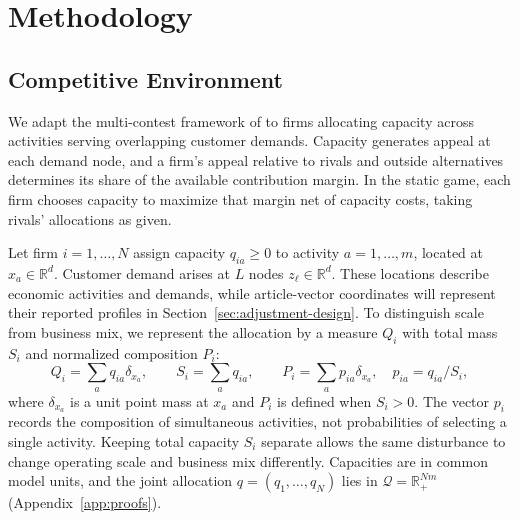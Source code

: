 \section{Methodology}\label{sec:model}

\subsection{Competitive Environment}\label{sec:model-payoff}

We adapt the multi-contest framework of
\citet{xu_zenou_zhou_conflict_2022} to firms allocating capacity
across activities serving overlapping customer demands.
Capacity generates appeal at each demand node, and a firm's appeal relative
to rivals and outside alternatives determines its share of the available
contribution margin.
In the static game, each firm chooses capacity to maximize that margin net
of capacity costs, taking rivals' allocations as given.

Let firm $i=1,\ldots,N$ assign capacity $q_{ia}\geq0$ to activity
$a=1,\ldots,m$, located at $x_a\in\mathbb R^d$.
Customer demand arises at $L$ nodes $z_\ell\in\mathbb R^d$.
These locations describe economic activities and demands, while article-vector
coordinates will represent their reported profiles in
Section~\ref{sec:adjustment-design}.
To distinguish scale from business mix, we represent the allocation by a
measure $Q_i$ with total mass $S_i$ and normalized composition $P_i$:
\begin{equation}\label{eq:position}
  Q_i=\sum_a q_{ia}\delta_{x_a},\qquad
  S_i=\sum_{a}q_{ia},\qquad
  P_i=\sum_a p_{ia}\delta_{x_a},\quad p_{ia}=q_{ia}/S_i,
\end{equation}
where $\delta_{x_a}$ is a unit point mass at $x_a$ and $P_i$ is defined when
$S_i>0$.
The vector $p_i$ records the composition of simultaneous activities, not
probabilities of selecting a single activity.
Keeping total capacity $S_i$ separate allows the same disturbance to change
operating scale and business mix differently.
Capacities are in common model units, and the joint allocation
$q=(q_1,\ldots,q_N)$ lies in $\mathcal Q=\mathbb R_+^{Nm}$
(Appendix~\ref{app:proofs}).

